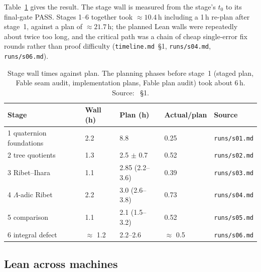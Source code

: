 \begin{sloppypar}
Table~\ref{tab:agentic-walls} gives the result. The stage wall is measured from the stage's $t_0$ to its final-gate
PASS. Stages 1--6 together took $\approx 10.4$\,h including a 1\,h re-plan after stage~1, against a plan of
$\approx 21.7$\,h; the planned Lean walls were repeatedly about twice too long, and the critical path was a chain of
cheap single-error fix rounds rather than proof difficulty (\texttt{timeline.md}~\S1, \texttt{runs/s04.md},
\texttt{runs/s06.md}).
\end{sloppypar}

\begin{table}[ht]
\centering\small\sloppy
\begin{tabular}{@{}lllll@{}}
\toprule
Stage & Wall (h) & Plan (h) & Actual/plan & Source \\
\midrule
1 quaternion foundations & 2.2 & 8.8 & 0.25 & \texttt{runs/s01.md} \\
2 tree quotients & 1.3 & 2.5 $\pm$ 0.7 & 0.52 & \texttt{runs/s02.md} \\
3 Ribet--Ihara & 1.1 & 2.85 (2.2--3.6) & 0.39 & \texttt{runs/s03.md} \\
4 $\Lambda$-adic Ribet & 2.2 & 3.0 (2.6--3.8) & 0.73 & \texttt{runs/s04.md} \\
5 comparison & 1.1 & 2.1 (1.5--3.2) & 0.52 & \texttt{runs/s05.md} \\
6 integral defect & $\approx$ 1.2 & 2.2--2.6 & $\approx$ 0.5 & \texttt{runs/s06.md} \\
\bottomrule
\end{tabular}
\caption{Stage wall times against plan. The planning phases before stage~1 (staged plan, Fable seam audit,
implementation plans, Fable plan audit) took about 6\,h. Source: ~\S1.}\label{tab:agentic-walls}
\end{table}

\subsection{Lean across machines}

